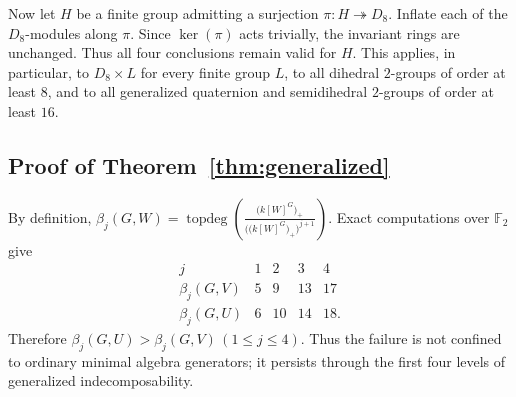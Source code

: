 \documentclass[11pt]{article}
\theoremstyle{definition}
\begin{document}
	Now let $H$ be a finite group admitting a surjection $\pi:H\twoheadrightarrow D_8$. Inflate each of the $D_8$-modules along $\pi$. Since $\ker(\pi)$ acts trivially, the invariant rings are unchanged. Thus all four conclusions remain valid for $H$. This applies, in particular, to $D_8\times L$ for every finite group $L$, to all dihedral $2$-groups of order at least $8$, and to all generalized quaternion and semidihedral $2$-groups of order at least $16$.

	\subsection*{Proof of Theorem~\ref{thm:generalized}}
	By definition, $\beta_j(G,W)=\operatorname{topdeg}
	\left(\frac{\bigl(k[W]^G\bigr)_+}
	{\bigl(\bigl(k[W]^G\bigr)_+\bigr)^{j+1}}
	\right)$. Exact computations over $\mathbb F_2$ give
	\[
	\begin{array}{c|cccc}
		j&1&2&3&4\\ \hline
		\beta_j(G,V)&5&9&13&17\\
		\beta_j(G,U)&6&10&14&18.
	\end{array}
	\]
	Therefore $\beta_j(G,U)>\beta_j(G,V) \, (1\leq j\leq4)$. Thus the failure is not confined to ordinary minimal algebra generators; it persists through the first four levels of generalized indecomposability.
\end{document}
